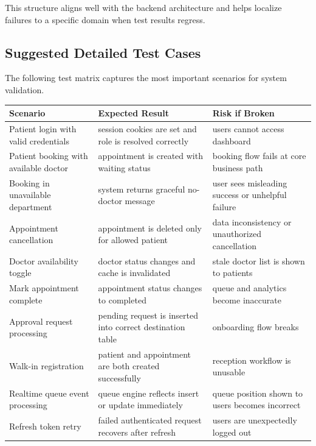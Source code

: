 \documentclass[12pt,onecolumn]{IEEEtran}
\begin{document}
This structure aligns well with the backend architecture and helps localize failures to a specific domain when test results regress.

\subsection{Suggested Detailed Test Cases}
The following test matrix captures the most important scenarios for system validation.

\begin{longtable}{p{}p{}p{}}
\toprule
\textbf{Scenario} & \textbf{Expected Result} & \textbf{Risk if Broken} \\
\midrule
Patient login with valid credentials & session cookies are set and role is resolved correctly & users cannot access dashboard \\
Patient booking with available doctor & appointment is created with waiting status & booking flow fails at core business path \\
Booking in unavailable department & system returns graceful no-doctor message & user sees misleading success or unhelpful failure \\
Appointment cancellation & appointment is deleted only for allowed patient & data inconsistency or unauthorized cancellation \\
Doctor availability toggle & doctor status changes and cache is invalidated & stale doctor list is shown to patients \\
Mark appointment complete & appointment status changes to completed & queue and analytics become inaccurate \\
Approval request processing & pending request is inserted into correct destination table & onboarding flow breaks \\
Walk-in registration & patient and appointment are both created successfully & reception workflow is unusable \\
Realtime queue event processing & queue engine reflects insert or update immediately & queue position shown to users becomes incorrect \\
Refresh token retry & failed authenticated request recovers after refresh & users are unexpectedly logged out \\
\bottomrule
\end{longtable}
\end{document}
